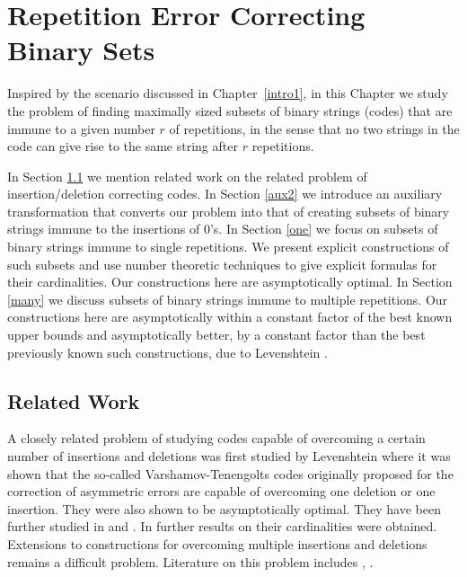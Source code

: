 \chapter[Repetition Error Correcting Binary Sets]{Repetition Error Correcting Binary
Sets}\label{numbertheory}



Inspired by the scenario discussed in Chapter~\ref{intro1}, in this
Chapter we study the problem of finding maximally sized subsets of
binary strings (codes) that are immune to a given number $r$ of
repetitions, in the sense that no two strings in the code can give
rise to the same string after $r$ repetitions.

In Section \ref{sectionrw} we mention related work on the related
problem of insertion/deletion correcting codes. In Section
\ref{aux2} we introduce an auxiliary transformation that converts
our problem into that of creating subsets of binary strings immune
to the insertions of $0$'s.
 In Section \ref{one} we
focus on subsets of binary strings immune to single repetitions.
We present explicit constructions of such subsets and use number
theoretic techniques to give explicit formulas for their
cardinalities. Our constructions here are asymptotically optimal.
In Section \ref{many} we discuss subsets of binary strings immune
to multiple repetitions. Our constructions here are asymptotically
within a constant factor of the best known upper bounds and
asymptotically better, by a constant factor than the best
previously known such constructions, due to Levenshtein
\cite{lev:66a}.

\section{Related Work}\label{sectionrw}

A closely related problem of studying codes capable of overcoming
a certain number of insertions and deletions was first studied by
Levenshtein \cite{lev:66} where it was shown that the so-called
Varshamov-Tenengolts codes \cite{vt:65} originally proposed for
the correction of asymmetric errors are capable of overcoming one
deletion or one insertion. They were also shown to be
asymptotically optimal. They have been further studied in
\cite{ferr:97} and \cite{bours:94}. In \cite{sloane:00} further
results on their cardinalities were obtained. Extensions to
constructions for overcoming multiple insertions and deletions
remains a difficult problem. Literature on this problem includes
\cite{ferr:02}, \cite{ferr:03}.

